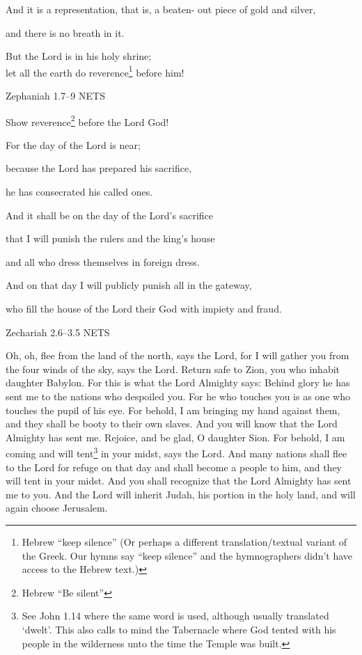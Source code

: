 \documentclass[
]{article}
\newcommand{\RL}[1]{\beginR #1\endR}
\begin{document}
And it is a representation, that is, a beaten- out piece of gold and
silver,

and there is no breath in it.

But the Lord is in his holy shrine;\\
let all the earth do reverence\footnote{Hebrew ``keep silence'' (Or
  perhaps a different translation/textual variant of the Greek. Our
  hymns say ``keep silence'' and the hymnographers didn't have access to
  the Hebrew text.)} before him!

Zephaniah 1.7--9 NETS

Show reverence\footnote{Hebrew ``Be silent''} before the Lord God!

For the day of the Lord is near;

because the Lord has prepared his sacrifice,

he has consecrated his called ones.

And it shall be on the day of the Lord\RL{'}s sacrifice

that I will punish the rulers and the king\RL{'}s house

and all who dress themselves in foreign dress.

And on that day I will publicly punish all in the gateway,

who fill the house of the Lord their God with impiety and fraud.

Zechariah 2.6--3.5 NETS

Oh, oh, flee from the land of the north, says the Lord, for I will
gather you from the four winds of the sky, says the Lord. Return safe to
Zion, you who inhabit daughter Babylon. For this is what the Lord
Almighty says: Behind glory he has sent me to the nations who despoiled
you. For he who touches you is as one who touches the pupil of his eye.
For behold, I am bringing my hand against them, and they shall be booty
to their own slaves. And you will know that the Lord Almighty has sent
me. Rejoice, and be glad, O daughter Sion. For behold, I am coming and
will tent\footnote{See John 1.14 where the same word is used, although
  usually translated `dwelt'. This also calls to mind the Tabernacle
  where God tented with his people in the wilderness unto the time the
  Temple was built.} in your midst, says the Lord. And many nations
shall flee to the Lord for refuge on that day and shall become a people
to him, and they will tent in your midst. And you shall recognize that
the Lord Almighty has sent me to you. And the Lord will inherit Judah,
his portion in the holy land, and will again choose Jerusalem.
\end{document}
